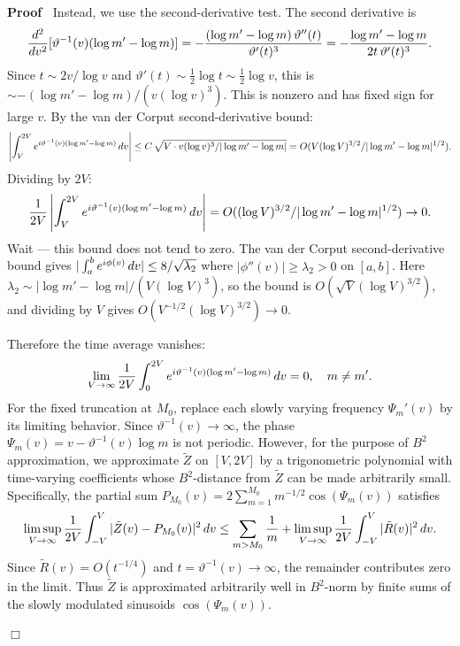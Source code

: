 \documentclass{article}
\newcommand{\tmtextbf}[1]{\text{{\bfseries{#1}}}}
\newenvironment{proof}{\noindent\textbf{Proof\ }}{\hspace*{\fill}$\Box$\medskip}
\begin{document}
\begin{proof}
  Instead, we use the second-derivative test. The second derivative is
  \[ \frac{d^2}{dv^2}  [\vartheta^{- 1} (v) (\log m' - \log m)] = -
     \frac{(\log m' - \log m)  \hspace{0.17em} \vartheta'' (t)}{\vartheta'
     (t)^3} = - \frac{\log m' - \log m}{2 t \hspace{0.17em} \vartheta' (t)^3}
     . \]
  Since $t \sim 2 v / \log v$ and $\vartheta' (t) \sim \tfrac{1}{2} \log t
  \sim \tfrac{1}{2} \log v$, this is $\sim - (\log m' - \log m) / (v (\log
  v)^3)$. This is nonzero and has fixed sign for large $v$. By the van der
  Corput second-derivative bound:
  \[ \left| \int_V^{2 V} e^{i \vartheta^{- 1} (v) (\log m' - \log m)} 
     \hspace{0.17em} dv \right| \le C \hspace{0.17em} \sqrt{V \cdot v (\log
     v)^3 / | \log m' - \log m|} = O (V (\log V)^{3 / 2} / | \log m' - \log
     m|^{1 / 2}) . \]
  Dividing by $2 V$:
  \[ \frac{1}{2 V} \left| \int_V^{2 V} e^{i \vartheta^{- 1} (v) (\log m' -
     \log m)}  \hspace{0.17em} dv \right| = O ((\log V)^{3 / 2} / | \log m' -
     \log m|^{1 / 2}) \to 0. \]
  Wait --- this bound does not tend to zero. The van der Corput
  second-derivative bound gives $| \int_a^b e^{i \phi (v)}  \hspace{0.17em}
  dv| \le 8 / \sqrt{\lambda_2}$ where $| \phi'' (v) | \ge \lambda_2 > 0$ on
  $[a, b]$. Here $\lambda_2 \sim | \log m' - \log m| / (V (\log V)^3)$, so the
  bound is $O (\sqrt{V} (\log V)^{3 / 2})$, and dividing by $V$ gives $O (V^{-
  1 / 2} (\log V)^{3 / 2}) \to 0$.
  
  Therefore the time average vanishes:
  \[ \lim_{V \to \infty}  \frac{1}{2 V}  \int_0^{2 V} e^{i \vartheta^{- 1} (v)
     (\log m' - \log m)}  \hspace{0.17em} dv = 0, \quad m \ne m' . \]
  \tmtextbf{Step 2: Approximation.} For the fixed truncation at $M_0$, replace
  each slowly varying frequency $\Psi_m' (v)$ by its limiting behavior. Since
  $\vartheta^{- 1} (v) \to \infty$, the phase $\Psi_m (v) = v - \vartheta^{-
  1} (v) \log m$ is not periodic. However, for the purpose of $B^2$
  approximation, we approximate $\tilde{Z}$ on $[V, 2 V]$ by a trigonometric
  polynomial with time-varying coefficients whose $B^2$-distance from
  $\tilde{Z}$ can be made arbitrarily small. Specifically, the partial sum
  $P_{M_0} (v) = 2 \sum_{m = 1}^{M_0} m^{- 1 / 2} \cos (\Psi_m (v))$ satisfies
  \[ \limsup_{V \to \infty}  \frac{1}{2 V}  \int_{- V}^V | \tilde{Z} (v) -
     P_{M_0} (v) |^2 \hspace{0.17em} dv \le \sum_{m > M_0} \frac{1}{m} +
     \limsup_{V \to \infty}  \frac{1}{2 V}  \int_{- V}^V | \tilde{R} (v) |^2 
     \hspace{0.17em} dv. \]
  Since $\tilde{R} (v) = O (t^{- 1 / 4})$ and $t = \vartheta^{- 1} (v) \to
  \infty$, the remainder contributes zero in the limit. Thus $\tilde{Z}$ is
  approximated arbitrarily well in $B^2$-norm by finite sums of the slowly
  modulated sinusoids $\cos (\Psi_m (v))$.
  

\end{proof}
\end{document}
